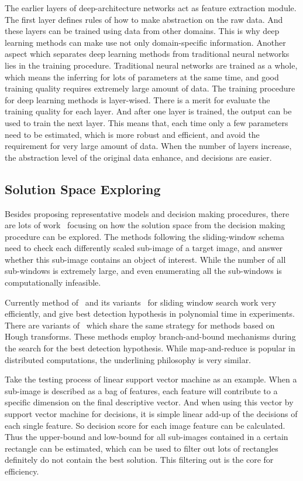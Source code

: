 The earlier layers of deep-architecture networks act as feature extraction module. The first layer defines rules of how to make abstraction on the raw data. And these layers can be trained using  data from other domains. This is why deep learning methods can make use not only domain-specific information. Another aspect which separates deep learning methods from traditional neural networks lies in the training procedure. Traditional neural networks are trained as a whole, which means the inferring for lots of parameters at the same time, and good training quality  requires extremely large amount of data. The training procedure for deep learning methods is layer-wised. There is a merit for evaluate the training quality for each layer. And after one layer is trained, the output can be used to train the next layer. This means that, each time only a few parameters need to be estimated, which is more robust and efficient, and avoid the requirement for very large amount of data. When the number of layers increase, the abstraction level of the original data enhance, and decisions are easier.


\subsection{Solution Space Exploring}
Besides proposing representative models and decision making procedures, there are lots of work~\citep{408,spm,ciod} focusing on how the solution space from the decision making procedure can be explored. The methods following the sliding-window schema need to check each differently scaled sub-image of a target image, and answer whether this sub-image contains an object of interest. While the number of all sub-windows is extremely large, and even enumerating all the sub-windows is computationally infeasible.

Currently method of~\citep{ij15} and its variants~\citep{ac1} for sliding window search work very efficiently, and give best detection hypothesis in polynomial time in experiments. There are variants of~\citep{ac27} which share the same strategy for methods based on Hough transforms. These methods employ branch-and-bound mechanisms during the search for the best detection hypothesis. While map-and-reduce is popular in distributed computations, the underlining philosophy is very similar.

Take the testing process of linear support vector machine as an example. When a sub-image is described as a bag of features, each feature will contribute to a specific dimension on the final descriptive vector.
And when using this vector by support vector machine for decisions, it is simple linear add-up of the decisions of each single feature. So decision score for each image feature can be calculated. Thus the upper-bound and low-bound for all sub-images contained in a certain rectangle can be estimated, which can be used to filter out lots of rectangles definitely do not contain the best solution. This filtering out is the core for efficiency.


